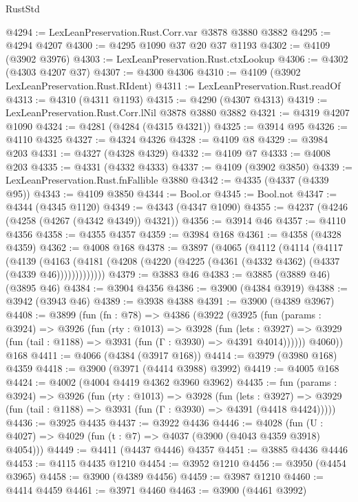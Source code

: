 \begin{lexlean}{RustStd}
\begin{coremodule}
@4294 := LexLeanPreservation.Rust.Corr.var @3878 @3880 @3882
@4295 := @4294 @4207
@4300 := @4295 @1090 @37 @20 @37 @1193
@4302 := @4109 (@3902 @3976)
@4303 := LexLeanPreservation.Rust.ctxLookup
@4306 := @4302 (@4303 @4207 @37)
@4307 := @4300 @4306
@4310 := @4109 (@3902 LexLeanPreservation.Rust.RIdent)
@4311 := LexLeanPreservation.Rust.readOf
@4313 := @4310 (@4311 @1193)
@4315 := @4290 (@4307 @4313)
@4319 := LexLeanPreservation.Rust.Corr.lNil @3878 @3880 @3882
@4321 := @4319 @4207 @1090
@4324 := @4281 (@4284 (@4315 @4321))
@4325 := @3914 @95
@4326 := @4110 @4325
@4327 := @4324 @4326
@4328 := @4109 @8
@4329 := @3984 @203
@4331 := @4327 (@4328 @4329)
@4332 := @4109 @7
@4333 := @4008 @203
@4335 := @4331 (@4332 @4333)
@4337 := @4109 (@3902 @3850)
@4339 := LexLeanPreservation.Rust.fnFallible @3880
@4342 := @4335 (@4337 (@4339 @95))
@4343 := @4109 @3850
@4344 := Bool.or
@4345 := Bool.not
@4347 := @4344 (@4345 @1120)
@4349 := @4343 (@4347 @1090)
@4355 := @4237 (@4246 (@4258 (@4267 (@4342 @4349)) @4321))
@4356 := @3914 @46
@4357 := @4110 @4356
@4358 := @4355 @4357
@4359 := @3984 @168
@4361 := @4358 (@4328 @4359)
@4362 := @4008 @168
@4378 := @3897
    (@4065
      (@4112
        (@4114
          (@4117
            (@4139
              (@4163 (@4181 (@4208 (@4220 (@4225 (@4361 (@4332 @4362) (@4337 (@4339 @46)))))))))))))
@4379 := @3883 @46
@4383 := @3885 (@3889 @46) (@3895 @46)
@4384 := @3904 @4356
@4386 := @3900 (@4384 @3919)
@4388 := @3942 (@3943 @46)
@4389 := @3938 @4388
@4391 := @3900 (@4389 @3967)
@4408 := @3899
    (fun (fn : @78) =>
    @4386
      (@3922
        (@3925
          (fun (params : @3924) =>
          @3926
            (fun (rty : @1013) =>
            @3928
              (fun (lets : @3927) =>
              @3929 (fun (tail : @1188) => @3931 (fun (Γ : @3930) => @4391 @4014))))))
        @4060))
    @168
@4411 := @4066 (@4384 (@3917 @168))
@4414 := @3979 (@3980 @168) @4359
@4418 := @3900 (@3971 (@4414 @3988) @3992)
@4419 := @4005 @168
@4424 := @4002 (@4004 @4419 @4362 @3960 @3962)
@4435 := fun (params : @3924) =>
  @3926
    (fun (rty : @1013) =>
    @3928
      (fun (lets : @3927) =>
      @3929 (fun (tail : @1188) => @3931 (fun (Γ : @3930) => @4391 (@4418 @4424)))))
@4436 := @3925 @4435
@4437 := @3922 @4436
@4446 := @4028 (fun (U : @4027) => @4029 (fun (t : @7) => @4037 (@3900 (@4043 @4359 @3918) @4054)))
@4449 := @4411 (@4437 @4446) @4357
@4451 := @3885 @4436 @4446
@4453 := @4115 @4435 @1210
@4454 := @3952 @1210
@4456 := @3950 (@4454 @3965)
@4458 := @3900 (@4389 @4456)
@4459 := @3987 @1210
@4460 := @4414 @4459
@4461 := @3971 @4460
@4463 := @3900 (@4461 @3992)

\end{coremodule}
\end{lexlean}
